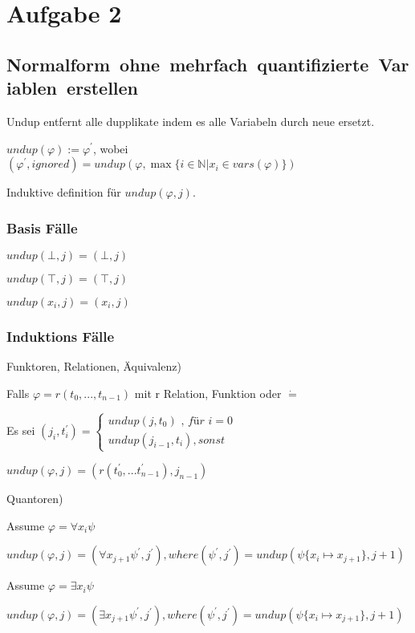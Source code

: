 \section*{Aufgabe 2}

\subsection*{\mbox{Normalform ohne mehrfach quantifizierte Variablen erstellen}}
Undup entfernt alle dupplikate indem es alle Variabeln durch neue ersetzt.

$undup(\varphi) := \varphi^\prime $, wobei $ (\varphi^\prime,ignored) = undup(\varphi,\max\limits{\{ i \in \mathbb{N} | x_i \in vars(\varphi)\}})$

Induktive definition für $undup(\varphi,j)$.

\subsubsection*{Basis Fälle}

$undup(\bot,j) = (\bot , j)$

$undup(\top,j) = (\top, j)$

$undup(x_i,j) = 	(x_i, j)$

\subsubsection*{Induktions Fälle}


Funktoren, Relationen, Äquivalenz) 

\hfill

Falls $\varphi = r(t_0,...,t_{n-1})$ mit r Relation, Funktion oder $\dot=$ 

Es sei $(j_i,t^\prime_i) = \begin{cases}
	undup(j,t_0) \textit{ , für } i=0 \\
	undup(j_{i-1},t_i) , sonst
\end{cases}$

$undup(\varphi,j) = (r(t^\prime_0,...t^\prime_{n-1}),j_{n-1})$

\hfill

Quantoren)

\hfill

Assume $\varphi = \forall x_i \psi$

$undup(\varphi, j) = 	(\forall x_{j+1} \psi^\prime , j^\prime),  where (\psi^\prime,j^\prime) = undup(\psi\{x_i \mapsto x_{j+1}\},j+1)$

Assume $\varphi = \exists x_i \psi$

$undup(\varphi, j) = 	(\exists x_{j+1} \psi^\prime , j^\prime),  where (\psi^\prime,j^\prime) = undup(\psi\{x_i \mapsto x_{j+1}\},j+1)$




